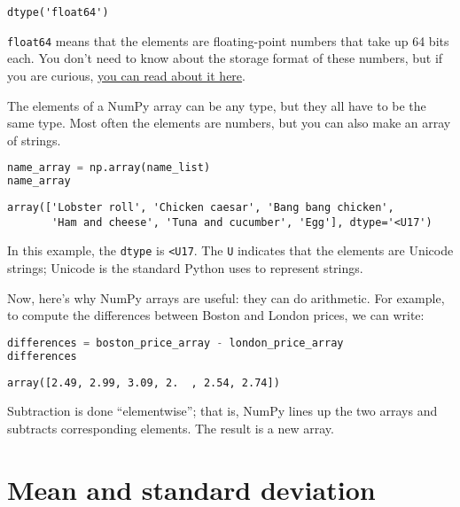 \begin{lstlisting}[style=output]
dtype('float64')
\end{lstlisting}

\passthrough{\lstinline!float64!} means that the elements are
floating-point numbers that take up 64 bits each. You don't need to know
about the storage format of these numbers, but if you are curious,
\href{https://en.wikipedia.org/wiki/Floating-point_arithmetic\#Internal_representation}{you
can read about it here}.

The elements of a NumPy array can be any type, but they all have to be
the same type. Most often the elements are numbers, but you can also
make an array of strings.

\begin{lstlisting}[language=Python,style=source]
name_array = np.array(name_list)
name_array
\end{lstlisting}

\begin{lstlisting}[style=output]
array(['Lobster roll', 'Chicken caesar', 'Bang bang chicken',
       'Ham and cheese', 'Tuna and cucumber', 'Egg'], dtype='<U17')
\end{lstlisting}

In this example, the \passthrough{\lstinline!dtype!} is
\passthrough{\lstinline!<U17!}. The \passthrough{\lstinline!U!}
indicates that the elements are Unicode strings; Unicode is the standard
Python uses to represent strings.

Now, here's why NumPy arrays are useful: they can do arithmetic. For
example, to compute the differences between Boston and London prices, we
can write:

\begin{lstlisting}[language=Python,style=source]
differences = boston_price_array - london_price_array
differences
\end{lstlisting}

\begin{lstlisting}[style=output]
array([2.49, 2.99, 3.09, 2.  , 2.54, 2.74])
\end{lstlisting}

Subtraction is done ``elementwise''; that is, NumPy lines up the two
arrays and subtracts corresponding elements. The result is a new array.

\hypertarget{mean-and-standard-deviation}{%
\section{Mean and standard
deviation}\label{mean-and-standard-deviation}}

